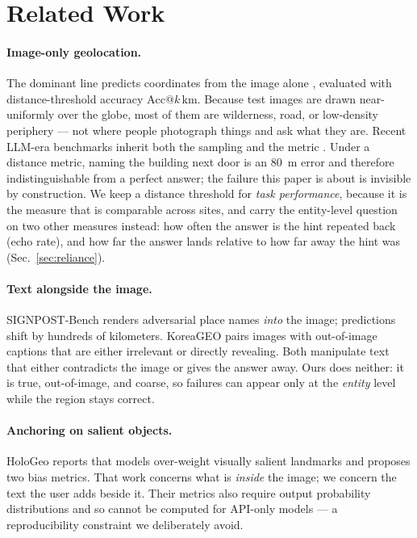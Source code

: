 \documentclass[10pt,a4paper]{article}
\begin{document}
\section{Related Work}

\paragraph{Image-only geolocation.} The dominant line predicts coordinates from
the image alone \citep{translocator}, evaluated with distance-threshold accuracy
$\mathrm{Acc}@k\,\si{\kilo\metre}$. Because test images are drawn near-uniformly
over the globe, most of them are wilderness, road, or low-density periphery ---
not where people photograph things and ask what they are. Recent LLM-era
benchmarks inherit both the sampling and the metric \citep{imageo}. Under a
distance metric, naming the building next door is an \SI{80}{\metre} error and
therefore indistinguishable from a perfect answer; the failure this paper is
about is invisible by construction. We keep a distance threshold for
\emph{task performance}, because it is the measure that is comparable across
sites, and carry the entity-level question on two other measures instead: how
often the answer is the hint repeated back (echo rate), and how far the answer
lands relative to how far away the hint was
(Sec.~\ref{sec:reliance}).

\paragraph{Text alongside the image.}
SIGNPOST-Bench \citep{signpost} renders adversarial place names \emph{into} the
image; predictions shift by hundreds of kilometers. KoreaGEO \citep{koreageo}
pairs images with out-of-image captions that are either irrelevant or directly
revealing. Both manipulate text that either contradicts the image or gives the
answer away. Ours does neither: it is true, out-of-image, and coarse, so failures
can appear only at the \emph{entity} level while the region stays correct.

\paragraph{Anchoring on salient objects.} HoloGeo \citep{hologeo} reports that
models over-weight visually salient landmarks and proposes two bias metrics.
That work concerns what is \emph{inside} the image; we concern the text the user
adds beside it. Their metrics also require output probability distributions and
so cannot be computed for API-only models --- a reproducibility constraint we
deliberately avoid.
\end{document}
